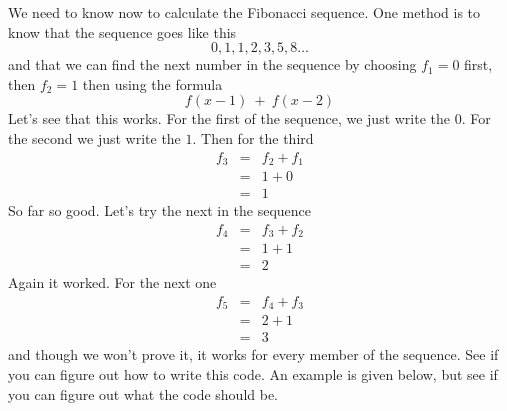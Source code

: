 We need to know now to calculate the Fibonacci sequence. One method is to
know that the sequence goes like this%
\begin{equation*}
0,1,1,2,3,5,8\ldots
\end{equation*}%
and that we can find the next number in the sequence by choosing $f_{1}=0$
first, then $f_{2}=1$ then using the formula 
\begin{equation*}
f(x-1)\ +\ f(x-2)
\end{equation*}%
Let's see that this works. For the first of the sequence, we just write the $%
0.$ For the second we just write the $1.$ Then for the third 
\begin{eqnarray*}
f_{3} &=&f_{2}+f_{1} \\
&=&1+0 \\
&=&1
\end{eqnarray*}%
So far so good. Let's try the next in the sequence%
\begin{eqnarray*}
f_{4} &=&f_{3}+f_{2} \\
&=&1+1 \\
&=&2
\end{eqnarray*}%
Again it worked. For the next one%
\begin{eqnarray*}
f_{5} &=&f_{4}+f_{3} \\
&=&2+1 \\
&=&3
\end{eqnarray*}%
and though we won't prove it, it works for every member of the sequence. See
if you can figure out how to write this code. An example is given below, but
see if you can figure out what the code should be.

